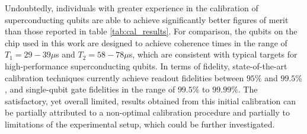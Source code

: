 Undoubtedly, individuals with greater experience in the calibration of superconducting qubits are able to achieve significantly better figures of merit than those reported in table \ref{tab:cal_results}.
For comparison, the qubits on the chip used in this work are designed to achieve coherence times in the range of $T_1 = 29 - 39 \mu$s and $T_2 = 58 - 78 \mu$s, which are consistent with typical targets for high-performance superconducting qubits. 
In terms of fidelity, state-of-the-art calibration techniques currently achieve readout fidelities between $95\%$ and $99.5\%$ \cite{krantz_quantum_2019}, and single-qubit gate fidelities in the range of $99.5\%$ to $99.99\%$.
The satisfactory, yet overall limited, results obtained from this initial calibration can be partially attributed to a non-optimal calibration procedure and partially to limitations of the experimental setup, which could be further investigated.